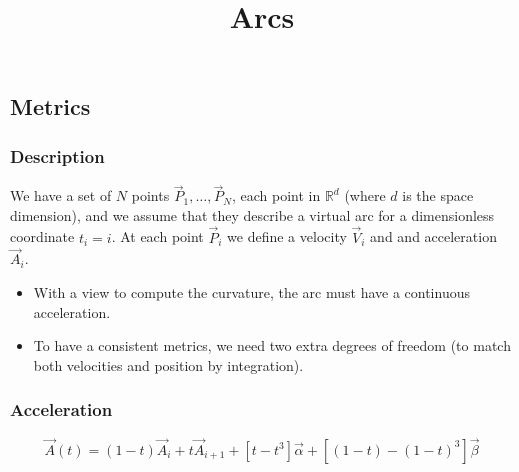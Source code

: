 \documentclass[aps,12pt]{revtex4}
\begin{document}
\title{Arcs}
\maketitle
	

\subsection{Metrics}

\subsubsection{Description}
We have a set of $N$ points $\vec{P}_1,\ldots,\vec{P}_N$, each point in $\mathbb{R}^d$ (where $d$ is the space dimension), and we assume
that they describe a virtual arc for a dimensionless coordinate $t_i=i$.
At each point $\vec{P}_i$ we define a velocity $\vec{V}_i$ and and acceleration $\vec{A}_i$.
\begin{itemize}
\item With a view to compute the curvature, the arc must have a continuous acceleration.
\item To have a consistent metrics, we need two extra degrees of freedom (to match both velocities and position by integration).
\end{itemize}

\subsubsection{Acceleration}

\begin{equation}
	\vec{A}(t) = (1-t)\vec{A}_i + t  \vec{A}_{i+1} + \left[ t - t^3 \right] \vec{\alpha} + \left[ (1-t) - (1-t)^3 \right] \vec{\beta}
\end{equation}
\end{document}
